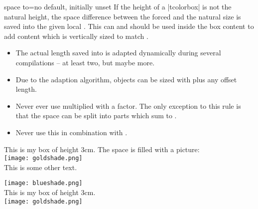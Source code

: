 \begin{docTcbKey}[][doc new=2015-02-15]{space to}{=}{no default, initially unset}
  If the height of a |tcolorbox| is not the natural height, the space
  difference between the forced and the natural size is saved into the
  given local . This  can and should be used inside
  the box content to add content which is vertically sized to match .
  \begin{marker}
    \begin{itemize}
    \item The actual length saved into  is adapted dynamically
      during several compilations -- at least two, but maybe more.
    \item Due to the adaption algorithm, objects can be sized with
       plus any offset length.
    \item Never ever use  multiplied with a factor. The only
      exception to this rule is that the space can be split into parts which
      sum to .
    \item Never use this in combination with .
    \end{itemize}
  \end{marker}
\begin{dispExample}
\begin{tcolorbox}[colframe=blue!75!black,colback=white,height=3cm,
    space to=\myspace]
  This is my box of height 3cm. The space is filled with a picture:\\[2mm]
  \texttt{[image: goldshade.png]}\\[1mm]
  This is some other text.
\end{tcolorbox}
\end{dispExample}

\begin{dispExample}
\begin{tcolorbox}[colframe=blue!75!black,colback=white,height=3cm,
    space to=\myspace]
  \texttt{[image: blueshade.png]}\\[1mm]
  This is my box of height 3cm.\\[2mm]
  \texttt{[image: goldshade.png]}
\end{tcolorbox}
\end{dispExample}
\end{docTcbKey}




